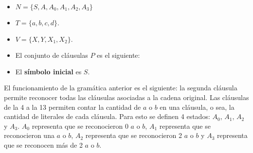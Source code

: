 \documentclass[12pt]{article}
\begin{document}
\begin{itemize}
    \item $N=\{S,A,A_0,A_1,A_2,A_3\}$
    \item $T=\{a,b,c,d\}$.
    \item $V=\{X,Y,X_1,X_2\}$.
    \item El conjunto de cláusulas $P$ es el siguiente:
          \begin{enumerate}
          \end{enumerate}
    \item El \textbf{símbolo inicial} es $S$.
\end{itemize}

El funcionamiento de la gramática anterior es el siguiente: la segunda cláusula permite reconocer todas las
cláusulas asociadas a la cadena original. Las cláusulas de la 4 a la 13 permiten contar la cantidad de $a$ o $b$ en
una cláusula, o sea, la cantidad de literales de cada cláusula. Para esto se definen 4 estados: $A_0$, $A_1$, $A_2$ y $A_3$.
$A_0$ representa que se reconocieron 0 $a$ o $b$, $A_1$ representa que se reconocieron una $a$ o $b$, $A_2$
representa que se reconocieron 2 $a$ o $b$ y  $A_3$ representa que se reconocen más de 2 $a$ o $b$.
\end{document}
